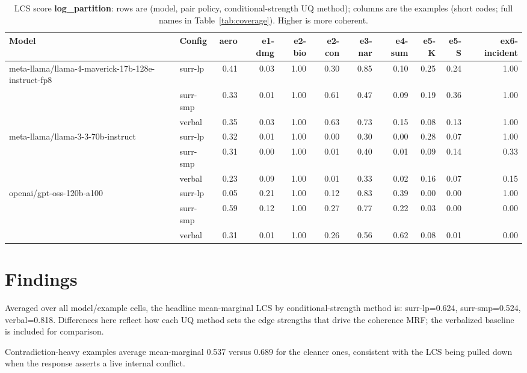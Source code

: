 \documentclass[11pt]{article}
\begin{document}
\begin{table}[htbp]
\centering
\footnotesize
\setlength{\tabcolsep}{3.5pt}
\caption{LCS score \textbf{log\_partition}: rows are (model, pair policy, conditional-strength UQ method); columns are the examples (short codes; full names in Table~\ref{tab:coverage}). Higher is more coherent.}
\label{tab:log-partition}
\begin{tabular}{llrrrrrrrrr}
\toprule
\textbf{Model} & \textbf{Config} & \textbf{aero} & \textbf{e1-dmg} & \textbf{e2-bio} & \textbf{e2-con} & \textbf{e3-nar} & \textbf{e4-sum} & \textbf{e5-K} & \textbf{e5-S} & \textbf{ex6-incident} \\
\midrule
meta-llama/llama-4-maverick-17b-128e-instruct-fp8 & surr-lp & 0.41 & 0.03 & 1.00 & 0.30 & 0.85 & 0.10 & 0.25 & 0.24 & 1.00 \\
 & surr-smp & 0.33 & 0.01 & 1.00 & 0.61 & 0.47 & 0.09 & 0.19 & 0.36 & 1.00 \\
 & verbal & 0.35 & 0.03 & 1.00 & 0.63 & 0.73 & 0.15 & 0.08 & 0.13 & 1.00 \\
\midrule
meta-llama/llama-3-3-70b-instruct & surr-lp & 0.32 & 0.01 & 1.00 & 0.00 & 0.30 & 0.00 & 0.28 & 0.07 & 1.00 \\
 & surr-smp & 0.31 & 0.00 & 1.00 & 0.01 & 0.40 & 0.01 & 0.09 & 0.14 & 0.33 \\
 & verbal & 0.23 & 0.09 & 1.00 & 0.01 & 0.33 & 0.02 & 0.16 & 0.07 & 0.15 \\
\midrule
openai/gpt-oss-120b-a100 & surr-lp & 0.05 & 0.21 & 1.00 & 0.12 & 0.83 & 0.39 & 0.00 & 0.00 & 1.00 \\
 & surr-smp & 0.59 & 0.12 & 1.00 & 0.27 & 0.77 & 0.22 & 0.03 & 0.00 & 0.00 \\
 & verbal & 0.31 & 0.01 & 1.00 & 0.26 & 0.56 & 0.62 & 0.08 & 0.01 & 0.00 \\
\bottomrule
\end{tabular}
\end{table}


\section{Findings}

Averaged over all model/example cells, the headline mean-marginal LCS by conditional-strength method is: surr-lp=0.624, surr-smp=0.524, verbal=0.818. Differences here reflect how each UQ method sets the edge strengths that drive the coherence MRF; the verbalized baseline is included for comparison.

Contradiction-heavy examples average mean-marginal 0.537 versus 0.689 for the cleaner ones, consistent with the LCS being pulled down when the response asserts a live internal conflict.
\end{document}
